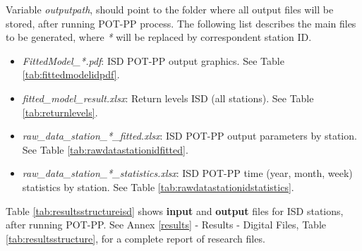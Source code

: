 \documentclass[12pt,twoside]{reedthesis}
\providecommand{\tightlist}{%
  \setlength{\itemsep}{0pt}\setlength{\parskip}{0pt}}
\begin{document}
Variable \emph{outputpath}, should point to the folder where all output files will be stored, after running POT-PP process. The following list describes the main files to be generated, where \emph{*} will be replaced by correspondent station ID.
\begin{itemize}
\tightlist
\item
  \emph{FittedModel\_*.pdf}: ISD POT-PP output graphics. See Table \ref{tab:fittedmodelidpdf}.
\item
  \emph{fitted\_model\_result.xlsx}: Return levels ISD (all stations). See Table \ref{tab:returnlevels}.
\item
  \emph{raw\_data\_station\_*\_fitted.xlsx}: ISD POT-PP output parameters by station. See Table \ref{tab:rawdatastationidfitted}.
\item
  \emph{raw\_data\_station\_*\_statistics.xlsx}: ISD POT-PP time (year, month, week) statistics by station. See Table \ref{tab:rawdatastationidstatistics}.
\end{itemize}
Table \ref{tab:resultsstructureisd} shows \textbf{input} and \textbf{output} files for ISD stations, after running POT-PP. See Annex \ref{results} - Results - Digital Files, Table \ref{tab:resultsstructure}, for a complete report of research files.
\end{document}
